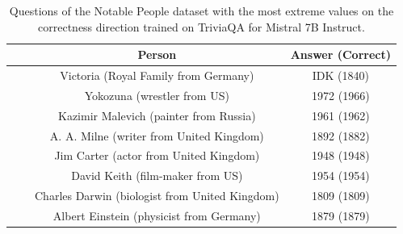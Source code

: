 \documentclass{article} %
\begin{document}
\begin{table}[!th]
  \centering
    \caption{Questions of the Notable People dataset with the most extreme values on the correctness direction trained on TriviaQA for Mistral 7B Instruct.}
  \label{tab:extremal}
  \begin{tabular}{ p{1.2cm}  p{0.9cm} c  c }
    \toprule
    & & Person & Answer (Correct)  \\
    \midrule
     &
     & Victoria (Royal Family from Germany) & IDK (1840) \\
    & & Yokozuna (wrestler from US) & 1972 (1966)\\
    \cmidrule(lr){2-4}
    &  & Kazimir Malevich (painter from Russia) & 1961 (1962)   \\
    & & A. A. Milne (writer from United Kingdom) & 1892 (1882)   \\
    \midrule
     &
     & Jim Carter (actor from United Kingdom) & 1948 (1948)   \\
    & & David Keith (film-maker from US) & 1954 (1954)   \\
    \cmidrule(lr){2-4}
    &  & Charles Darwin (biologist from United Kingdom) & 1809 (1809)   \\
    & & Albert Einstein (physicist from Germany) & 1879 (1879)   \\
    \midrule
  \end{tabular}
\end{table}


\end{document}
